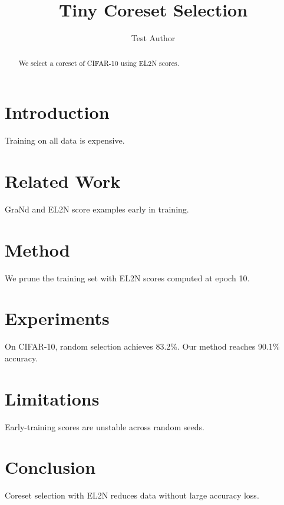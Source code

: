 \documentclass{article}
\title{Tiny Coreset Selection}
\author{Test Author}
\begin{document}
\maketitle
\begin{abstract}
We select a coreset of CIFAR-10 using EL2N scores.
\end{abstract}
\section{Introduction}
Training on all data is expensive.

\section{Related Work}
GraNd and EL2N score examples early in training.
\section{Method}
We prune the training set with EL2N scores computed at epoch 10.
\section{Experiments}
On CIFAR-10, random selection achieves 83.2\%. Our method reaches 90.1\% accuracy.
\section{Limitations}
Early-training scores are unstable across random seeds.
\section{Conclusion}
Coreset selection with EL2N reduces data without large accuracy loss.
\end{document}
